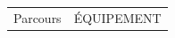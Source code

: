 \documentclass[lanscape, 10pt,twoside,a4paper]{article}
\begin{document}
\begin{landscape}
\begin{tabular}{ p{} p{} p{} p{} p{} }
\end{tabular}

\clearpage


\begin{tabular}{|p{}|p{}}
	Parcours 	&	ÉQUIPEMENT \\
\end{tabular}

\clearpage
	


\end{landscape}
\end{document}
